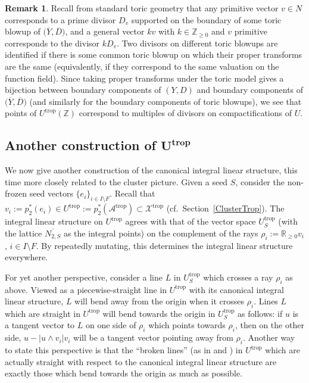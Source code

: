 \documentclass[11pt]{article}
\numberwithin{equation}{section}
\numberwithin{figure}{section}
\numberwithin{table}{section}
\DeclareMathOperator{\trop}{trop}
\let\?=\overline
\let\bb=\mathbb
\let\s=\mathcal
\theoremstyle{definition}
\newtheorem{rmk}[thm]{Remark}
\begin{document}
\begin{rmk}\label{divisorial} Recall from standard toric geometry that any primitive vector $v\in N$ corresponds to a prime divisor $D_v$ supported on the boundary of some toric blowup of $\big(\?{Y},\?{D}\big)$, and a general vector $kv$ with $k\in \bb{Z}_{\geq 0}$ and $v$ primitive corresponds to the divisor $kD_{v}$. Two divisors on different toric blowups are identified if there is some common toric blowup on which their proper transforms are the same (equivalently, if they correspond to the same valuation on the function field). Since taking proper transforms under the toric model gives a bijection between boundary components of $(Y,D)$ and boundary components of $\big(\?{Y},\?{D}\big)$ (and similarly for the boundary components of toric blowups), we see that points of $U^{\trop}(\bb{Z})$ correspond to multiples of divisors on compactifications of $U$.
\end{rmk}

\subsection[Another construction of $U^{\trop}$]{Another construction of $\boldsymbol{U^{\trop}}$}\label{SeedScatter}
We now give another construction of the canonical integral linear structure, this time more closely related to the cluster picture. Given a seed $S$, consider the non-frozen seed vectors $\{e_i\}_{i\in I\setminus F}$. Recall that $v_i:=p_2^*(e_i) \in U^{\trop}:=p_2^*(\s{A}^{\trop})\subset \s{X}^{\trop}$ (cf.\ Section~\ref{ClusterTrop}). The integral linear structure on $U^{\trop}$ agrees with that of the vector space $U^{\trop}_S$ (with the lattice $\?{N_{2,S}}$ as the integral points) on the complement of the rays $\rho_i:=\bb{R}_{\geq 0} v_i$, $i\in I\setminus F$. By repeatedly mutating, this determines the integral linear structure everywhere.

For yet another perspective, consider a line $L$ in $U^{\trop}_S$ which crosses a ray $\rho_i$ as above. Viewed as a piecewise-straight line in $U^{\trop}$ with its canonical integral linear structure, $L$ will bend away from the origin when it crosses $\rho_i$. Lines $L$ which are straight in $U^{\trop}$ will bend towards the origin in $U^{\trop}_S$ as follows: if $u$ is a tangent vector to $L$ on one side of $\rho_i$ which points towards $\rho_i$, then on the other side, $u-|u\wedge v_i| v_i$ will be a tangent vector pointing away from $\rho_i$.
 Another way to state this perspective is that the ``broken lines'' (as in \cite{GHK1} and \cite{GHKK}) in $U^{\trop}$ which are actually straight with respect to the canonical integral linear structure are exactly those which bend towards the origin as much as possible.
\end{document}
